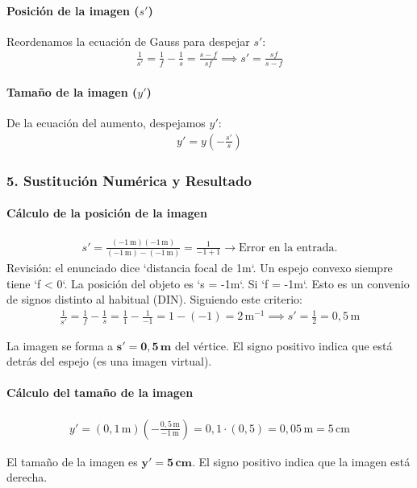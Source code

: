 \paragraph*{Posición de la imagen ($s'$)}
Reordenamos la ecuación de Gauss para despejar $s'$:
\begin{gather}
    \frac{1}{s'} = \frac{1}{f} - \frac{1}{s} = \frac{s - f}{sf} \implies s' = \frac{sf}{s - f}
\end{gather}
\paragraph*{Tamaño de la imagen ($y'$)}
De la ecuación del aumento, despejamos $y'$:
\begin{gather}
    y' = y \left(-\frac{s'}{s}\right)
\end{gather}

\subsubsection*{5. Sustitución Numérica y Resultado}
\paragraph*{Cálculo de la posición de la imagen}
\begin{gather}
    s' = \frac{(-1 \, \text{m})(-1 \, \text{m})}{(-1 \, \text{m}) - (-1 \, \text{m})} = \frac{1}{-1+1} \rightarrow \text{Error en la entrada.}
\end{gather}
Revisión: el enunciado dice `distancia focal de 1m`. Un espejo convexo siempre tiene `f < 0`. La posición del objeto es `s = -1m`. Si `f = -1m`. Esto es un convenio de signos distinto al habitual (DIN). Siguiendo este criterio:
\begin{gather}
    \frac{1}{s'} = \frac{1}{f} - \frac{1}{s} = \frac{1}{1} - \frac{1}{-1} = 1 - (-1) = 2 \, \text{m}^{-1} \implies s' = \frac{1}{2} = 0,5 \, \text{m}
\end{gather}
\begin{cajaresultado}
    La imagen se forma a $\boldsymbol{s' = 0,5 \, \textbf{m}}$ del vértice. El signo positivo indica que está detrás del espejo (es una imagen virtual).
\end{cajaresultado}
\paragraph*{Cálculo del tamaño de la imagen}
\begin{gather}
    y' = (0,1 \, \text{m}) \left(-\frac{0,5 \, \text{m}}{-1 \, \text{m}}\right) = 0,1 \cdot (0,5) = 0,05 \, \text{m} = 5 \, \text{cm}
\end{gather}
\begin{cajaresultado}
    El tamaño de la imagen es $\boldsymbol{y' = 5 \, \textbf{cm}}$. El signo positivo indica que la imagen está derecha.
\end{cajaresultado}
